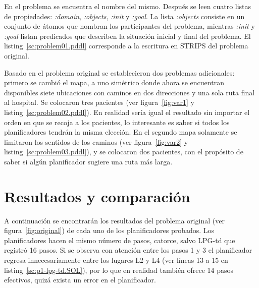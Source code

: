 \documentclass[a4paper,12pt,twocolumn]{article}
\begin{document}


En el problema se encuentra el nombre del mismo. Después se leen cuatro listas de propiedades: \emph{:domain}, \emph{:objects}, \emph{:init} y \emph{:goal}. La lista \emph{:objects} consiste en un conjunto de átomos que nombran los participantes del problema, mientras \emph{:init} y \emph{:goal} listan predicados que describen la situación inicial y final del problema. El listing~\ref{sc:problem01.pddl} corresponde a la escritura en STRIPS del problema original.



Basado en el problema original se establecieron dos problemas adicionales: primero se cambió el mapa, a uno simétrico donde ahora se encuentran disponibles siete ubicaciones con caminos en dos direcciones y una sola ruta final al hospital. Se colocaron tres pacientes (ver figura~\ref{fig:var1} y listing~\ref{sc:problem02.pddl}). En realidad sería igual el resultado sin importar el orden en que se recoja a los pacientes, lo interesante es saber si todos los planificadores tendrán la misma elección. En el segundo mapa solamente se limitaron los sentidos de los caminos (ver figura~\ref{fig:var2} y listing~\ref{sc:problem03.pddl}), y se colocaron dos pacientes, con el propósito de saber si algún planificador sugiere una ruta más larga.




\section{Resultados y comparación}

A continuación se encontrarán los resultados del problema original (ver figura~\ref{fig:original}) de cada uno de los planificadores probados. Los planificadores hacen el mismo número de pasos, catorce, salvo LPG-td que registró 16 pasos. Si se observa con atención entre los pasos 1 y 3 el planificador regresa innecesariamente entre los lugares L2 y L4 (ver líneas 13 a 15 en listing~\ref{sc:p1-lpg-td.SOL}), por lo que en realidad también ofrece 14 pasos efectivos, quizá exista un error en el planificador.
\end{document}
